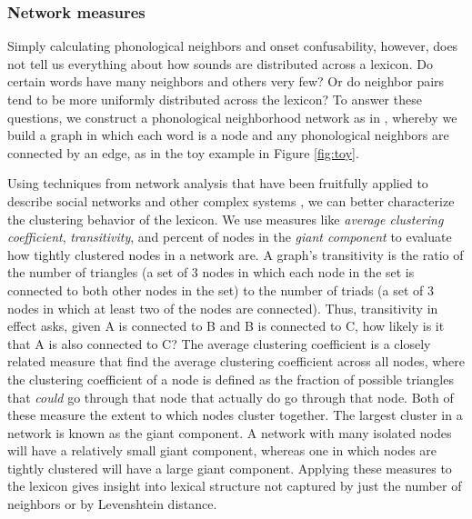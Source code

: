 \documentclass{article}
\begin{document}
\subsubsection{Network measures}

Simply calculating phonological neighbors and onset confusability, however, does not tell us everything about
how sounds are distributed across a lexicon. Do certain words have many neighbors and others very few? Or do
neighbor pairs tend to be more uniformly distributed across the lexicon? To answer these questions, we
construct a phonological neighborhood network as in \cite{arbesman_structure_2010}, whereby we build a graph
in which each word is a node and any phonological neighbors are connected by an edge, as in the toy example in
Figure \ref{fig:toy}.

Using techniques from network analysis that have been fruitfully applied to describe social networks and other
complex systems \citep{wasserman1994social,watts1998collective,barabasi1999emergence}, we can better
characterize the clustering behavior of the lexicon. We use measures like \emph{average clustering
coefficient}, \emph{transitivity}, and percent of nodes in the \textit{giant component} to evaluate how
tightly clustered nodes in a network are. A graph's transitivity is the ratio of the number of triangles (a
set of 3 nodes in which each node in the set is connected to both other nodes in the set) to the number of
triads (a set of 3 nodes in which at least two of the nodes are connected). Thus, transitivity in effect asks,
given A is connected to B and B is connected to C, how likely is it that A is also connected to C? The average
clustering coefficient is a closely related measure that find the average clustering coefficient across all
nodes, where the clustering coefficient of a node is defined as the fraction of possible triangles that
\textit{could} go through that node that actually do go through that node. Both of these measure the extent to
which nodes cluster together. The largest cluster in a network is known as the giant component. A network with
many isolated nodes will have a relatively small giant component, whereas one in which nodes are tightly
clustered will have a large giant component. Applying these measures to the lexicon gives insight into lexical
structure not captured by just the number of neighbors or by Levenshtein distance.
\end{document}
